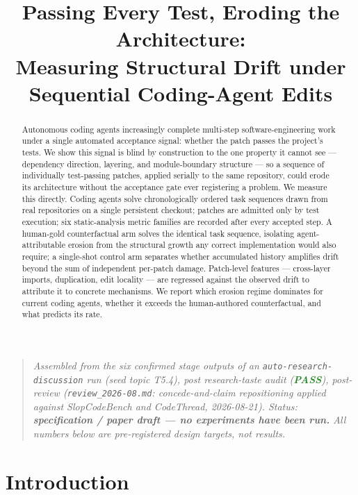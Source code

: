 \documentclass[11pt]{article}
\title{\textbf{Passing Every Test, Eroding the Architecture:\\ Measuring Structural Drift under Sequential Coding-Agent Edits}}
\author{}
\date{}
\begin{document}
\maketitle
\vspace{-2em}

\begin{quote}
\small\textit{Assembled from the six confirmed stage outputs of an \texttt{auto-research-discussion} run (seed topic T5.4), post research-taste audit (\textcolor{ForestGreen}{\textbf{PASS}}), post-review (\texttt{review\_2026-08.md}: concede-and-claim repositioning applied against SlopCodeBench and CodeThread, 2026-08-21). Status: \textbf{specification / paper draft --- no experiments have been run.} All numbers below are pre-registered design targets, not results.}
\end{quote}

\begin{abstract}
Autonomous coding agents increasingly complete multi-step software-engineering work under a single automated acceptance signal: whether the patch passes the project's tests. We show this signal is blind by construction to the one property it cannot see --- dependency direction, layering, and module-boundary structure --- so a sequence of individually test-passing patches, applied serially to the same repository, could erode its architecture without the acceptance gate ever registering a problem. We measure this directly. Coding agents solve chronologically ordered task sequences drawn from real repositories on a single persistent checkout; patches are admitted only by test execution; six static-analysis metric families are recorded after every accepted step. A human-gold counterfactual arm solves the identical task sequence, isolating agent-attributable erosion from the structural growth any correct implementation would also require; a single-shot control arm separates whether accumulated history amplifies drift beyond the sum of independent per-patch damage. Patch-level features --- cross-layer imports, duplication, edit locality --- are regressed against the observed drift to attribute it to concrete mechanisms. We report which erosion regime dominates for current coding agents, whether it exceeds the human-authored counterfactual, and what predicts its rate.
\end{abstract}

\section{Introduction}
\end{document}
